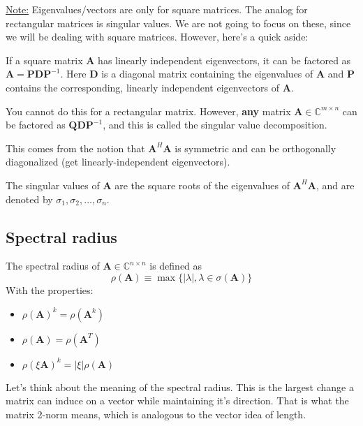 \documentclass[12pt]{article}
\newcommand{\ve}[1]{\ensuremath{\mathbf{#1}}}
\begin{document}
\underline{Note:} Eigenvalues/vectors are only for square matrices. The analog for rectangular matrices is singular values. We are not going to focus on these, since we will be dealing with square matrices. However, here's a quick aside:

If a square matrix $\ve{A}$ has linearly independent eigenvectors, it can be factored as $\ve{A} = \ve{P}\ve{D}\ve{P}^{-1}$. Here $\ve{D}$ is a diagonal matrix containing the eigenvalues of $\ve{A}$ and $\ve{P}$ contains the corresponding, linearly independent eigenvectors of $\ve{A}$.  

You cannot do this for a rectangular matrix. However, \textbf{any} matrix $\ve{A} \in \mathbb{C}^{m \times n}$ can be factored as $\ve{Q}\ve{D}\ve{P}^{-1}$, and this is called the singular value decomposition. 

This comes from the notion that $\ve{A}^H\ve{A}$ is symmetric and can be orthogonally diagonalized (get linearly-independent eigenvectors). 

The singular values of $\ve{A}$ are the square roots of the eigenvalues of $\ve{A}^H\ve{A}$, and are denoted by $\sigma_1, \sigma_2, \dots, \sigma_n$. 

\subsection{Spectral radius} 

The spectral radius of $\ve{A} \in \mathbb{C}^{n \times n}$ is defined as 
\[\rho(\ve{A}) \equiv \max \lbrace |\lambda|, \lambda \in \sigma(\ve{A}) \rbrace\]
With the properties:
%
\begin{itemize}
\item $\rho(\ve{A})^k = \rho(\ve{A}^k)$
\item $\rho(\ve{A}) = \rho(\ve{A}^T)$
\item $\rho(\xi \ve{A})^k = |\xi| \rho(\ve{A})$
\end{itemize}
%
Let's think about the meaning of the spectral radius. This is the largest change a matrix can induce on a vector while maintaining it's direction. That is what the matrix 2-norm means, which is analogous to the vector idea of length.
\end{document}
